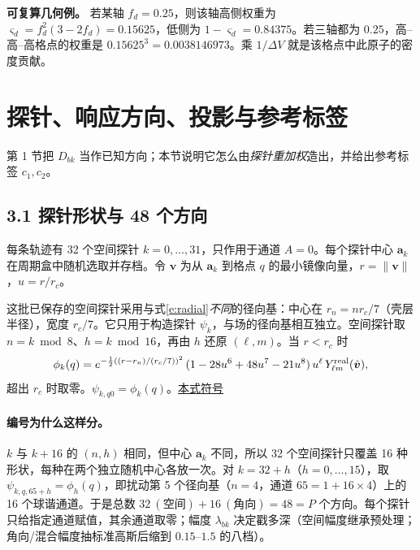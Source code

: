 \documentclass[UTF8,fontset=none,10pt,a4paper]{ctexart}
\newcommand{\sd}[1]{\hfill\mbox{\footnotesize\hyperlink{sym:#1}{本式符号}}\par}
\begin{document}
\textbf{可复算几何例。} 若某轴 $f_d=0.25$，则该轴高侧权重为 $\varsigma_d=f_d^2(3-2f_d)=0.15625$，低侧为 $1-\varsigma_d=0.84375$。若三轴都为 $0.25$，高–高–高格点的权重是 $0.15625^3=0.0038146973$。乘 $1/\Delta V$ 就是该格点中此原子的密度贡献。

\section*{探针、响应方向、投影与参考标签}
第 1 节把 $D_{bk}$ 当作已知方向；本节说明它怎么由\emph{探针重加权}造出，并给出参考标签 $c_1,c_2$。

\subsection*{3.1 探针形状与 48 个方向}
每条轨迹有 32 个空间探针 $k=0,\ldots,31$，只作用于通道 $A=0$。每个探针中心 $\bm a_k$ 在周期盒中随机选取并存档。令 $\bm v$ 为从 $\bm a_k$ 到格点 $q$ 的最小镜像向量，$r=\|\bm v\|$，$u=r/r_c$。

这批已保存的空间探针采用与式\eqref{e:radial}\emph{不同}的径向基：中心在 $r_n=nr_c/7$（壳层半径），宽度 $r_c/7$。它只用于构造探针 $\psi_k$，与场的径向基相互独立。空间探针取 $n=k\bmod8$、$h=k\bmod16$，再由 $h$ 还原 $(\ell,m)$。当 $r<r_c$ 时
\begin{equation}\label{e:probe}
 \phi_k(q)=e^{-\frac12((r-r_n)/(r_c/7))^2}\,
 (1-28u^6+48u^7-21u^8)\,u^\ell\,Y_{\ell m}^{\rm real}(\hat{\bm v}),
\end{equation}
超出 $r_c$ 时取零。$\psi_{k,q0}=\phi_k(q)$。\sd{e:probe}

\paragraph{编号为什么这样分。} $k$ 与 $k+16$ 的 $(n,h)$ 相同，但中心 $\bm a_k$ 不同，所以 32 个空间探针只覆盖 16 种形状，每种在两个独立随机中心各放一次。对 $k=32+h$（$h=0,\ldots,15$），取 $\psi_{k,q,65+h}=\phi_h(q)$，即扰动第 5 个径向基（$n=4$，通道 $65=1+16\times4$）上的 16 个球谐通道。于是总数 $32\ (\text{空间})+16\ (\text{角向})=48=P$ 个方向。每个探针只给指定通道赋值，其余通道取零；幅度 $\lambda_{bk}$ 决定戳多深（空间幅度继承预处理；角向/混合幅度抽标准高斯后缩到 $0.15$–$1.5$ 的八档）。
\end{document}

